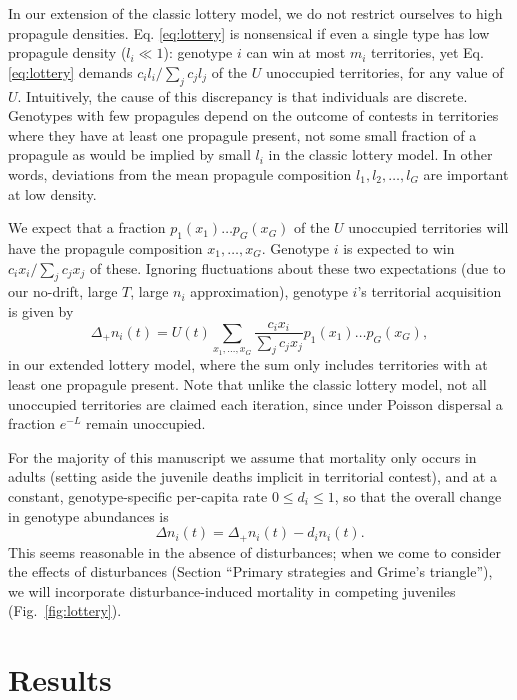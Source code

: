 \documentclass[11pt]{article}
\begin{document}
In our extension of the classic lottery model, we do not restrict ourselves to high propagule densities. Eq. \eqref{eq:lottery} is nonsensical if even a single type has low propagule density ($l_i\ll 1$): genotype $i$ can win at most $m_i$ territories, yet Eq. \eqref{eq:lottery} demands $c_i l_i/\sum_j c_j l_j$ of the $U$ unoccupied territories, for any value of $U$. Intuitively, the cause of this discrepancy is that individuals are discrete. Genotypes with few propagules depend on the outcome of contests in territories where they have at least one propagule present, not some small fraction of a propagule as would be implied by small $l_i$ in the classic lottery model. In other words, deviations from the mean propagule composition $l_1,l_2,\ldots,l_G$ are important at low density. 

We expect that a fraction $p_1(x_1)\ldots p_G(x_G)$ of the $U$ unoccupied territories will have the propagule composition $x_1,\ldots,x_G$. Genotype $i$ is expected to win $c_i x_i/\sum_j c_j x_j$ of these. Ignoring fluctuations about these two expectations (due to our no-drift, large $T$, large $n_i$ approximation), genotype $i$'s territorial acquisition is given by
\begin{equation}
\Delta_+ n_i(t)=U(t)\sum_{x_1,\ldots,x_G} \frac{c_i x_i}{\sum_j c_j x_j} p_1(x_1)\ldots p_G(x_G), \label{eq:growthsumuncoupled}
\end{equation}
in our extended lottery model, where the sum only includes territories with at least one propagule present. Note that unlike the classic lottery model, not all unoccupied territories are claimed each iteration, since under Poisson dispersal a fraction $e^{-L}$ remain unoccupied.

For the majority of this manuscript we assume that mortality only occurs in adults (setting aside the juvenile deaths implicit in territorial contest), and at a constant, genotype-specific per-capita rate $0\leq d_i\leq 1$, so that the overall change in genotype abundances is
\begin{equation}
\Delta n_i(t)=\Delta_+ n_i(t)-d_i n_i(t). \label{eq:delttot}
\end{equation}
This seems reasonable in the absence of disturbances; when we come to consider the effects of disturbances (Section ``Primary strategies and Grime's triangle''), we will incorporate disturbance-induced mortality in competing juveniles (Fig.~\ref{fig:lottery}).   

\section*{Results}
\end{document}
